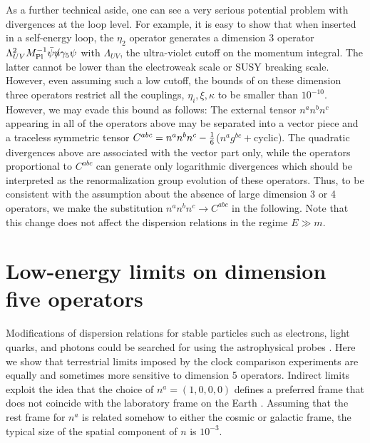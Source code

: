 As a further technical aside, one can see a very serious potential
problem with divergences at the loop level. For example, it is
easy to show that when inserted in a self-energy loop, the
$\eta_2$ operator generates a dimension 3 operator
$\Lambda^2_{UV}\mpl^{-1} \bar \psi \sla{n}\gamma_5\psi $ with
$\Lambda_{UV}$, the ultra-violet cutoff on the momentum integral.
The latter cannot be lower than the electroweak scale or SUSY
breaking scale. However, even assuming such a low cutoff, the
bounds of \cite{Kost} on these dimension three operators restrict
all the couplings, $\eta_i, \xi, \kappa$ to be smaller than
$10^{-10}$. However, we may evade this bound as follows: The
external tensor $n^an^bn^c$ appearing in all of the operators
above may be separated into a vector piece and a traceless
symmetric tensor $C^{abc}= n^an^bn^c -{{\scriptstyle 1}\over{\scriptstyle 6}}$($n^ag^{bc}+$cyclic).
The quadratic divergences above are associated with the vector
part only, while the operators proportional to $C^{abc}$ can
generate only logarithmic divergences which should be interpreted
as the renormalization group evolution of these operators. Thus,
to be consistent with the assumption about the absence of large
dimension 3 or 4 operators, we make the substitution $n^an^bn^c
\rightarrow C^{abc}$ in the following. Note that this change does
not affect the dispersion relations in the regime $E\gg m$.

\section{Low-energy limits on dimension five operators}

Modifications of dispersion relations for stable particles such as
electrons, light quarks, and photons could be searched for using
the astrophysical probes \cite{mass,Jacob,wow,rot}. Here we show
that terrestrial limits imposed by the clock comparison
experiments are equally and sometimes
more sensitive to dimension 5 operators. Indirect
limits exploit the idea that the choice of $n^a=(1,0,0,0)$ defines
a preferred frame that does not coincide with the laboratory frame
on the Earth \cite{nuCPT}. Assuming that the rest frame for $n^a$
is related somehow to either the cosmic or galactic frame, the
typical size of the spatial component of $n$ is $10^{-3}$.

